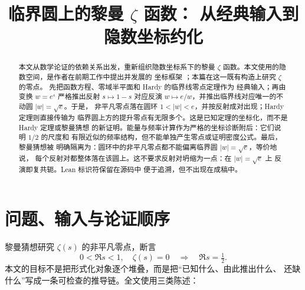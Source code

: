 \documentclass[submission,noinfoline]{jsfds}
\begin{document}
\begin{frontmatter}

\title{临界圆上的黎曼 \texorpdfstring{$\zeta$}{zeta} 函数：
从经典输入到隐数坐标约化}

\begin{aug}
\end{aug}

\begin{abstract}
本文从数学论证的依赖关系出发，重新组织隐数坐标系下的黎曼
$\zeta$ 函数。本文使用的隐数空间，是作者在前期工作中提出并发展的
坐标框架 \citep{LiuXu2026bridge}；本篇在这一既有构造上研究 $\zeta$ 的零点。
先把函数方程、零域半平面和 Hardy 的临界线零点定理作为
经典输入；再由变换 $w=e^s$ 严格推出反射 $s\mapsto1-s$ 对应反演
$w\mapsto e/w$，并推出临界线对应唯一的不动圆 $|w|=\sqrt e$。于是，
非平凡零点落在圆环 $1<|w|<e$，并按反射成对出现；Hardy 定理则直接传输为
临界圆上方的提升零点有无限多个。这是已知定理的坐标化，而不是 Hardy 定理或黎曼猜想
的新证明。能量与频率计算作为严格的坐标诊断附后：它们说明 $1/2$ 的尺度和
有限近似的频率结构，但不能单独产生零点或证明密度公式。最后，黎曼猜想被
明确隔离为：圆环中的非平凡零点都不能偏离临界圆 $|w|=\sqrt e$，等价地说，
每个反射对都整体落在该圆上。这不要求反射对坍缩为一点：在 $|w|=\sqrt e$ 上
反演即复共轭。Lean 标识符保留在源码中
便于追溯，但不出现在成稿中。
\end{abstract}

\begin{keywords}
\end{keywords}

\begin{AMSclass}
\end{AMSclass}
\end{frontmatter}

\section{问题、输入与论证顺序}\label{sec:intro}

黎曼猜想研究 $\zeta(s)$ 的非平凡零点，断言
\[
  0<\Re s<1,\quad \zeta(s)=0
  \quad\Longrightarrow\quad \Re s=\tfrac12 .
\]
本文的目标不是把形式化对象逐个堆叠，而是把“已知什么、由此推出什么、
还缺什么”写成一条可检查的推导链。全文使用三类陈述：
\end{document}
